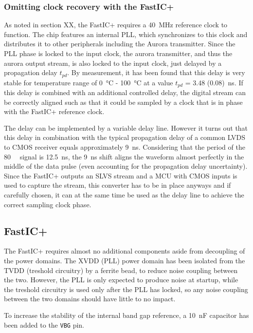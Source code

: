 \documentclass{cernatsnote}
\begin{document}
\subsubsection{Omitting clock recovery with the FastIC+}
As noted in section XX, the FastIC+ requires a \SI{40}{\mega\hertz} reference clock to function. The chip features an internal PLL, which synchronizes to this clock and distributes it to other peripherals including the Aurora transmitter. Since the PLL phase is locked to the input clock, the aurora transmitter, and thus the aurora output stream, is also locked to the input clock, just delayed by a propagation delay $t_{pd}$. By measurement, it has been found that this delay is very stable for temperature range of \SI{0}{\celsius} - \SI{100}{\celsius} at a value $t_{pd}$ = \SI{3.48 (0.08)}{\nano\second}. If this delay is combined with an additional controlled delay, the digital stream can be correctly aligned such as that it could be sampled by a clock that is in phase with the FastIC+ reference clock.

The delay can be implemented by a variable delay line. However it turns out that this delay in combination with the typical propagation delay of a common LVDS to CMOS receiver equals approximately \SI{9}{\nano\second}. Considering that the period of the \SI{80}{\mega\bit} signal is \SI{12.5}{\nano\second}, the \SI{9}{\nano\second} shift aligns the waveform almost perfectly in the middle of the data pulse (even accounting for the propagation delay uncertainty). Since the FastIC+ outputs an SLVS stream and a MCU with CMOS inputs is used to capture the stream, this converter has to be in place anyways and if carefully chosen, it can at the same time be used as the delay line to achieve the correct sampling clock phase. 

\subsection{FastIC+}
The FastIC+ requires almost no additional components aside from decoupling of the power domains. The XVDD (PLL) power domain has been isolated from the TVDD (treshold circuitry) by a ferrite bead, to reduce noise coupling between the two. However, the PLL is only expected to produce noise at startup, while the treshold circuitry is used only after the PLL has locked, so any noise coupling between the two domains should have little to no impact.

To increase the stability of the internal band gap reference, a \SI{10}{\nano\farad} capacitor has been added to the \verb|VBG| pin.
\end{document}
